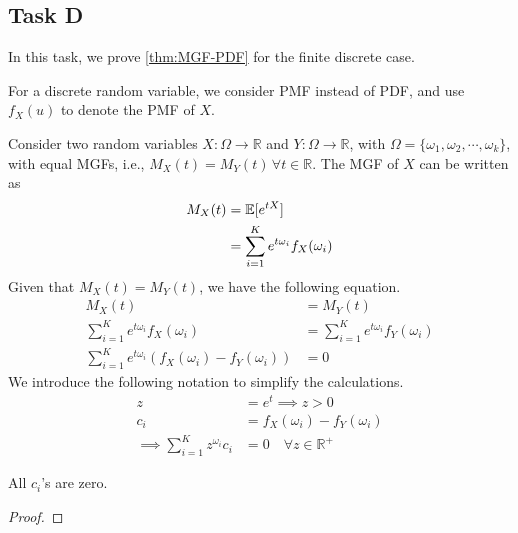 \subsection*{Task D}\label{taskD}
In this task, we prove \cref{thm:MGF-PDF} for the finite discrete case.
\begin{remark}
	For a discrete random variable, we consider PMF instead of PDF, and use $f_X(u)$ to denote the PMF of $X$.
\end{remark}
Consider two random variables $X:\Omega \to \mathbb{R}$ and $Y:\Omega\to\mathbb{R}$, with $\Omega = \{\omega_1, \omega_2,\cdots, \omega_k\}$, with equal MGFs, i.e., $M_X(t) = M_Y(t)\,\forall t\in\mathbb{R}$.
The MGF of $X$ can be written as
\begin{align*}
	M_X(t) & = \operatorname{\mathbb{E}}[e^{tX}]                              \\
	       & = \sum_{i=1}^K e^{t\omega_i} f_X(\omega_i) \\
\end{align*}
Given that $M_X(t) = M_Y(t)$, we have the following equation.
\begin{align*}
	M_X(t)                                                                 & = M_Y(t)                                   \\
	\sum_{i=1}^K e^{t\omega_i} f_X(\omega_i)                               & = \sum_{i=1}^K e^{t\omega_i} f_Y(\omega_i) \\
	\sum_{i=1}^K e^{t\omega_i} \left(f_X(\omega_i) -  f_Y(\omega_i)\right) & = 0
\end{align*}
We introduce the following notation to simplify the calculations.
\begin{align*}
	z                                      & = e^t  \implies z > 0                   \\
	c_i                                    & = f_X(\omega_i) - f_Y(\omega_i)         \\
	\implies \sum_{i=1}^K z^{\omega_i} c_i & = 0\hspace{1em}\forall z\in\mathbb{R}^+
\end{align*}

\begin{claim}
	All $c_i$'s are zero.
\end{claim}
\begin{proof}

\end{proof}

